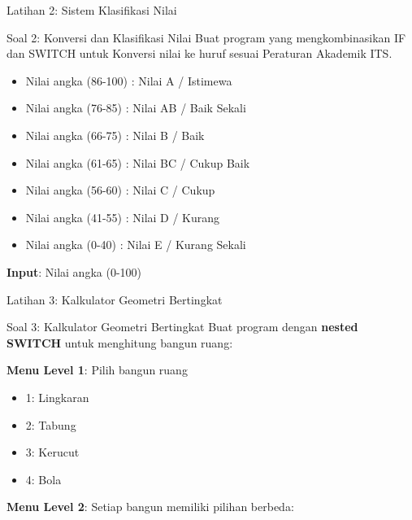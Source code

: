 \documentclass{beamer}
\begin{document}
\begin{frame}{Latihan 2: Sistem Klasifikasi Nilai}
  \begin{block}{Soal 2: Konversi dan Klasifikasi Nilai}
  Buat program yang mengkombinasikan IF dan SWITCH untuk Konversi nilai ke huruf sesuai Peraturan Akademik ITS.
    \begin{itemize}
        \item Nilai angka (86-100) : Nilai A / Istimewa \\
        \item Nilai angka (76-85) : Nilai AB / Baik Sekali \\
        \item Nilai angka (66-75) : Nilai B / Baik \\
        \item Nilai angka (61-65) : Nilai BC / Cukup Baik \\
        \item Nilai angka (56-60) : Nilai C / Cukup \\
        \item Nilai angka (41-55) : Nilai D / Kurang \\
        \item Nilai angka (0-40) : Nilai E / Kurang Sekali
    \end{itemize}

    \textbf{Input}: Nilai angka (0-100)
  \end{block}
\end{frame}

\begin{frame}[fragile]{Latihan 3: Kalkulator Geometri Bertingkat}
  \begin{block}{Soal 3: Kalkulator Geometri Bertingkat}
    Buat program dengan \textbf{nested SWITCH} untuk menghitung bangun ruang:
    
    \textbf{Menu Level 1}: Pilih bangun ruang
    \begin{itemize}
      \item 1: Lingkaran
      \item 2: Tabung  
      \item 3: Kerucut
      \item 4: Bola
    \end{itemize}
    
    \textbf{Menu Level 2}: Setiap bangun memiliki pilihan berbeda:
  \end{block}
\end{frame}
\end{document}
